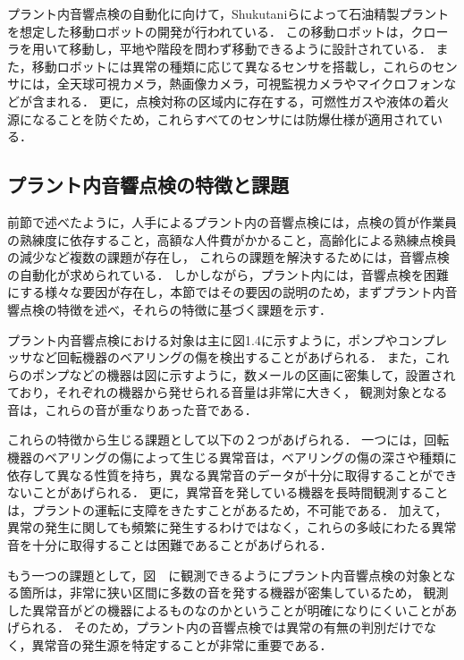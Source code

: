 \documentclass[../main]{subfiles}
\begin{document}
プラント内音響点検の自動化に向けて，Shukutaniらによって石油精製プラントを想定した移動ロボットの開発が行われている．
この移動ロボットは，クローラを用いて移動し，平地や階段を問わず移動できるように設計されている．
また，移動ロボットには異常の種類に応じて異なるセンサを搭載し，これらのセンサには，全天球可視カメラ，熱画像カメラ，可視監視カメラやマイクロフォンなどが含まれる．
更に，点検対称の区域内に存在する，可燃性ガスや液体の着火源になることを防ぐため，これらすべてのセンサには防爆仕様が適用されている．

\subsection{プラント内音響点検の特徴と課題}

前節で述べたように，人手によるプラント内の音響点検には，点検の質が作業員の熟練度に依存すること，高額な人件費がかかること，高齢化による熟練点検員の減少など複数の課題が存在し，
これらの課題を解決するためには，音響点検の自動化が求められている．
しかしながら，プラント内には，音響点検を困難にする様々な要因が存在し，本節ではその要因の説明のため，まずプラント内音響点検の特徴を述べ，それらの特徴に基づく課題を示す．

プラント内音響点検における対象は主に図1.4に示すように，ポンプやコンプレッサなど回転機器のベアリングの傷を検出することがあげられる．
また，これらのポンプなどの機器は図に示すように，数メールの区画に密集して，設置されており，それぞれの機器から発せられる音量は非常に大きく，
観測対象となる音は，これらの音が重なりあった音である．

これらの特徴から生じる課題として以下の２つがあげられる．
一つには，回転機器のベアリングの傷によって生じる異常音は，ベアリングの傷の深さや種類に依存して異なる性質を持ち，異なる異常音のデータが十分に取得することができないことがあげられる．
更に，異常音を発している機器を長時間観測することは，プラントの運転に支障をきたすことがあるため，不可能である．
加えて，異常の発生に関しても頻繁に発生するわけではなく，これらの多岐にわたる異常音を十分に取得することは困難であることがあげられる．

もう一つの課題として，図　に観測できるようにプラント内音響点検の対象となる箇所は，非常に狭い区間に多数の音を発する機器が密集しているため，
観測した異常音がどの機器によるものなのかということが明確になりにくいことがあげられる．
そのため，プラント内の音響点検では異常の有無の判別だけでなく，異常音の発生源を特定することが非常に重要である．
\end{document}
